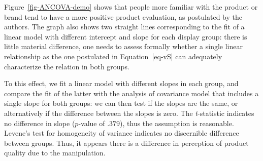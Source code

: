 \documentclass[
  11pt,
  letterpaper,
]{scrbook}
\theoremstyle{definition}
\theoremstyle{remark}
\begin{document}
Figure~\ref{fig-ANCOVA-demo} shows that people more familiar with the
product or brand tend to have a more positive product evaluation, as
postulated by the authors. The graph also shows two straight lines
corresponding to the fit of a linear model with different intercept and
slope for each display group: there is little material difference, one
needs to assess formally whether a single linear relationship as the one
postulated in Equation~\ref{eq-vS} can adequately characterize the
relation in both groups.

To this effect, we fit a linear model with different slopes in each
group, and compare the fit of the latter with the analysis of covariance
model that includes a single slope for both groups: we can then test if
the slopes are the same, or alternatively if the difference between the
slopes is zero. The \emph{t}-statistic indicates no difference in slope
(\(p\)-value of \(.379\)), thus the assumption is reasonable. Levene's
test for homogeneity of variance indicates no discernible difference
between groups. Thus, it appears there is a difference in perception of
product quality due to the manipulation.
\end{document}
